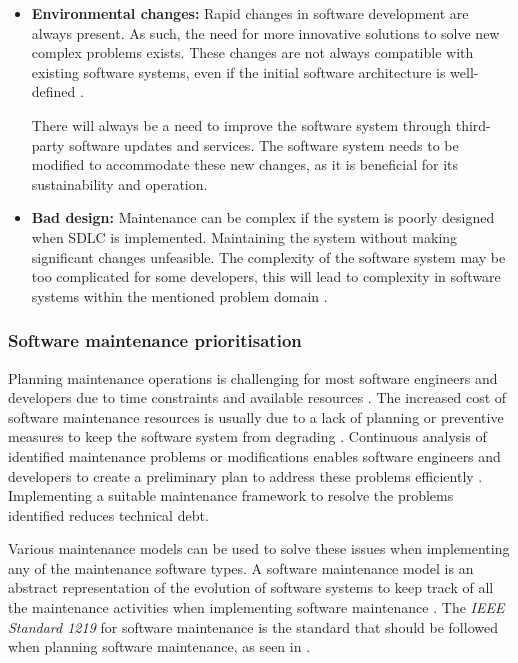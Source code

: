 \begin{itemize}
	\item \textbf{Environmental changes:} Rapid changes in software development are always present. As such, the need for more innovative solutions to solve new complex problems exists. These changes are not always compatible with existing software systems, even if the initial software architecture is well-defined \cite{Ogheneovo2014}. \par There will always be a need to improve the software system through third-party software updates and services. The software system needs to be modified to accommodate these new changes, as it is beneficial for its sustainability and operation.
	\item \textbf{Bad design:} Maintenance can be complex if the system is poorly designed when SDLC is implemented. Maintaining the system without making significant changes unfeasible. The complexity of the software system may be too complicated for some developers, this will lead to complexity in software systems within the mentioned problem domain \cite{Lenarduzzi2017}.
\end{itemize}

\subsubsection{Software maintenance prioritisation}\label{sec:ch1_maintenanceModel}
Planning maintenance operations is challenging for most software engineers and developers due to time constraints and available resources \cite{DeLeon-Sigg2020}. The increased cost of software maintenance resources is usually due to a lack of planning or preventive measures to keep the software system from degrading \cite{Alenezi2016}. Continuous analysis of identified maintenance problems or modifications enables software engineers and developers to create a preliminary plan to address these problems efficiently \cite{Port2017}. Implementing a suitable maintenance framework to resolve the problems identified reduces technical debt.\par Various maintenance models can be used to solve these issues when implementing any of the maintenance software types. A software maintenance model is an abstract representation of the evolution of software systems to keep track of all the maintenance activities when implementing software maintenance \cite{Ren2011}. The \textit{IEEE Standard 1219} for software maintenance is the standard that should be followed when planning software maintenance, as seen in . 

